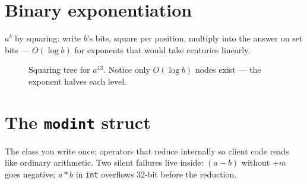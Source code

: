 \section{Binary exponentiation}\label{sec:binpow}
$a^b$ by squaring: write $b$'s bits, square per position, multiply
into the answer on set bits --- $O(\log b)$ for exponents that would
take centuries linearly.
\begin{figure}[ht]\centering

\caption{Squaring tree for $a^{13}$. Notice only $O(\log b)$
nodes exist --- the exponent halves each level.}
\label{fig:binpow}
\end{figure}

\section{The \texttt{modint} struct}\label{sec:modint}
The class you write once: operators that reduce internally so
client code reads like ordinary arithmetic. Two silent failures
live inside: $(a-b)$ without $+m$ goes negative; $a*b$ in
\texttt{int} overflows 32-bit before the reduction.


